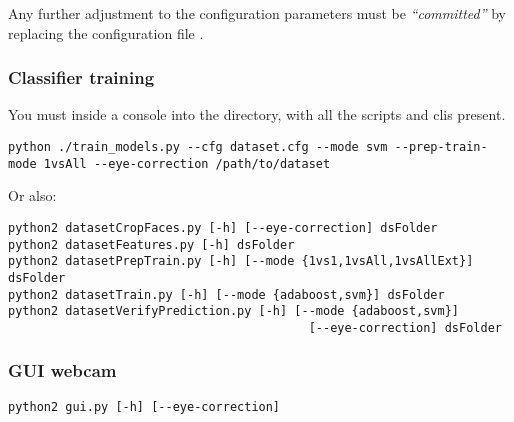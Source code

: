 Any further adjustment to the configuration parameters must be
\emph{``committed''} by replacing the configuration file
.

\subsubsection*{Classifier training}

You must inside a console into the  directory, with all the
scripts and clis present.

\begin{verbatim}
python ./train_models.py --cfg dataset.cfg --mode svm --prep-train-mode 1vsAll --eye-correction /path/to/dataset
\end{verbatim}

Or also:

\begin{verbatim}
python2 datasetCropFaces.py [-h] [--eye-correction] dsFolder
python2 datasetFeatures.py [-h] dsFolder
python2 datasetPrepTrain.py [-h] [--mode {1vs1,1vsAll,1vsAllExt}] dsFolder
python2 datasetTrain.py [-h] [--mode {adaboost,svm}] dsFolder
python2 datasetVerifyPrediction.py [-h] [--mode {adaboost,svm}]
                                          [--eye-correction] dsFolder
\end{verbatim}

\subsubsection*{GUI webcam}

\begin{verbatim}
python2 gui.py [-h] [--eye-correction]
\end{verbatim}
